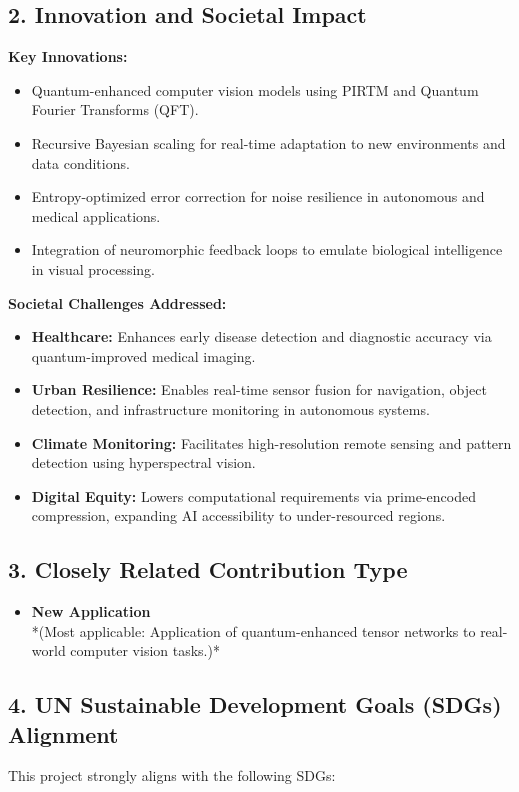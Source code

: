 \documentclass{article}
\theoremstyle{plain}
\begin{document}
\subsection*{2. Innovation and Societal Impact}

\textbf{Key Innovations:}
\begin{itemize}
    \item Quantum-enhanced computer vision models using PIRTM and Quantum Fourier Transforms (QFT).
    \item Recursive Bayesian scaling for real-time adaptation to new environments and data conditions.
    \item Entropy-optimized error correction for noise resilience in autonomous and medical applications.
    \item Integration of neuromorphic feedback loops to emulate biological intelligence in visual processing.
\end{itemize}

\textbf{Societal Challenges Addressed:}
\begin{itemize}
    \item \textbf{Healthcare:} Enhances early disease detection and diagnostic accuracy via quantum-improved medical imaging.
    \item \textbf{Urban Resilience:} Enables real-time sensor fusion for navigation, object detection, and infrastructure monitoring in autonomous systems.
    \item \textbf{Climate Monitoring:} Facilitates high-resolution remote sensing and pattern detection using hyperspectral vision.
    \item \textbf{Digital Equity:} Lowers computational requirements via prime-encoded compression, expanding AI accessibility to under-resourced regions.
\end{itemize}

\subsection*{3. Closely Related Contribution Type}
\begin{itemize}
    \item \checkmark \hspace{1mm} \textbf{New Application} \\
    *(Most applicable: Application of quantum-enhanced tensor networks to real-world computer vision tasks.)*
\end{itemize}

\subsection*{4. UN Sustainable Development Goals (SDGs) Alignment}
This project strongly aligns with the following SDGs:
\end{document}
